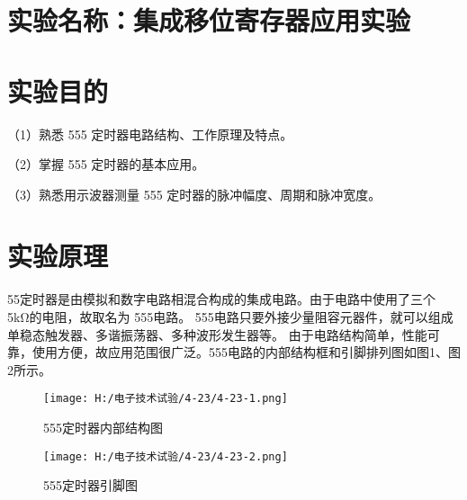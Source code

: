 \documentclass{article}
\begin{document}
	\section{ 实验名称：集成移位寄存器应用实验}
    \section{ 实验目的}
     （1）熟悉 555 定时器电路结构、工作原理及特点。\par 
               （2）掌握 555 定时器的基本应用。\par
               （3）熟悉用示波器测量 555 定时器的脉冲幅度、周期和脉冲宽度。 \par
   	\section{ 实验原理}
      
       55定时器是由模拟和数字电路相混合构成的集成电路。由于电路中使用了三个 5kΩ的电阻，故取名为 555电路。
       555电路只要外接少量阻容元器件，就可以组成单稳态触发器、多谐振荡器、多种波形发生器等。
       由于电路结构简单，性能可靠，使用方便，故应用范围很广泛。555电路的内部结构框和引脚排列图如图1、图2所示。
       \begin{figure}[h]
        \begin{minipage}[t]{0.5\linewidth} %
          \centering   
          \texttt{[image: H:/电子技术试验/4-23/4-23-1.png]}   
          \caption{555定时器内部结构图}   
          \label{fig:side:a}   
        \end{minipage}%
        \begin{minipage}[t]{0.5\linewidth}   
          \centering   
          \texttt{[image: H:/电子技术试验/4-23/4-23-2.png]}   
          \caption{555定时器引脚图}   
          \label{fig:side:b}   
        \end{minipage}   
      \end{figure}
\end{document}
